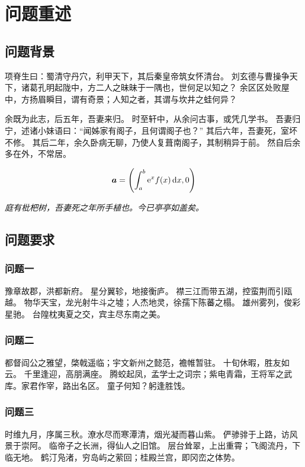 \section{问题重述}

\subsection{问题背景}

项脊生曰：蜀清守丹穴，利甲天下，其后秦皇帝筑女怀清台。
刘玄德与曹操争天下，诸葛孔明起陇中，方二人之昧昧于一隅也，世何足以知之？
余区区处败屋中，方扬眉瞬目，谓有奇景；人知之者，其谓与坎井之蛙何异？ 

余既为此志，后五年，吾妻来归。
时至轩中，从余问古事，或凭几学书。
吾妻归宁，述诸小妹语曰：“闻姊家有阁子，且何谓阁子也？”
其后六年，吾妻死，室坏不修。
其后二年，余久卧病无聊，乃使人复葺南阁子，其制稍异于前。
然自后余多在外，不常居。

\begin{equation}
    \boldsymbol{a}=\left(\int_a^b\mathrm{e}^xf(x)\mathop{}\!\mathrm{d}{x}, 0\right)
\end{equation}

\textit{庭有枇杷树，吾妻死之年所手植也。今已亭亭如盖矣。 }

\subsection{问题要求}

\subsubsection{问题一}

豫章故郡，洪都新府。
星分翼轸，地接衡庐。
襟三江而带五湖，控蛮荆而引瓯越。
物华天宝，龙光射牛斗之墟；人杰地灵，徐孺下陈蕃之榻。
雄州雾列，俊彩星驰。
台隍枕夷夏之交，宾主尽东南之美。

\subsubsection{问题二}

都督阎公之雅望，棨戟遥临；宇文新州之懿范，襜帷暂驻。
十旬休暇，胜友如云。
千里逢迎，高朋满座。
腾蛟起凤，孟学士之词宗；紫电青霜，王将军之武库。家君作宰，路出名区。
童子何知？躬逢胜饯。 

\subsubsection{问题三}

时维九月，序属三秋。潦水尽而寒潭清，烟光凝而暮山紫。
俨骖𬴂于上路，访风景于崇阿。
临帝子之长洲，得仙人之旧馆。
层台耸翠，上出重霄；飞阁流丹，下临无地。
鹤汀凫渚，穷岛屿之萦回；桂殿兰宫，即冈峦之体势。 

